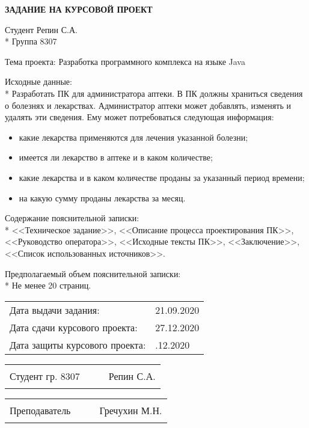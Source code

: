 \begin{center}
    \uppercase{\textbf{Задание на курсовой проект}}
\end{center}

Студент Репин С.А. \\*
Группа 8307

\vspace{0.2cm}

Тема проекта: Разработка программного комплекса на языке Java

\vspace{0.2cm}

Исходные данные:\\*
Разработать ПК для администратора аптеки. В ПК должны храниться сведения о
болезнях и лекарствах. Администратор аптеки может добавлять,  изменять  и
удалять  эти  сведения.  Ему  может  потребоваться следующая информация:
\begin{itemize}
    \item какие лекарства применяются для лечения указанной болезни;
    \item имеется ли лекарство в аптеке и в каком количестве;
    \item какие лекарства и в каком количестве проданы за указанный период
            времени;
    \item на какую сумму проданы лекарства за месяц.
\end{itemize}

\vspace{0.2cm}

Содержание пояснительной записки:\\*
<<Техническое задание>>, <<Описание процесса проектирования ПК>>, <<Руководство
оператора>>, <<Исходные тексты ПК>>, <<Заключение>>, <<Список использованных
источников>>.

\vspace{0.2cm}

Предполагаемый объем пояснительной записки: \\*
Не менее 20 страниц.

\vspace{0.2cm}

\begin{tabular}{@{}ll}
    Дата выдачи задания: & 21.09.2020 \\
    Дата сдачи курсового проекта: & 27.12.2020 \\
    Дата защиты курсового проекта: & \phantom{21}.12.2020 \\
\end{tabular}

\vspace{0.2cm}

\begin{tabularx}{\textwidth}{@{}lcXr}
    Студент гр. 8307 & \hspace{1.6cm} & \rule{5cm}{1pt} & Репин С.А.
\end{tabularx}

\begin{tabularx}{\textwidth}{@{}lcXr}
    Преподаватель & \hspace{2cm} & \rule{5cm}{1pt} & Гречухин М.Н.
\end{tabularx}



\clearpage

